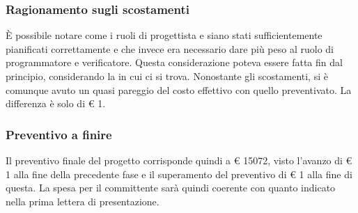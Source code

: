 \subsubsection{Ragionamento sugli scostamenti}
È possibile notare come i ruoli di progettista e  siano stati sufficientemente pianificati correttamente e che invece era necessario dare più peso al ruolo di programmatore e verificatore. Questa considerazione poteva essere fatta fin dal principio, considerando la  in cui ci si trova.\newline
Nonostante gli scostamenti, si è comunque avuto un quasi pareggio del costo effettivo con quello preventivato. La differenza è solo di \euro{} 1.

\subsubsection{Preventivo a finire}
Il preventivo finale del progetto corrisponde quindi a \euro{} 15072, visto l'avanzo di \euro{} 1 alla fine della precedente fase e il superamento del preventivo di \euro{} 1 alla fine di questa. La spesa per il committente sarà quindi coerente con quanto indicato nella prima lettera di presentazione. 